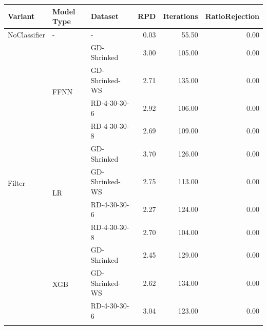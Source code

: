 \begin{table}[ht]
	\small
	\centering
	\renewcommand{\arraystretch}{1.1}
	\begin{tabular}{lllrrr}
		\toprule
		\textbf{Variant}          & \textbf{Model Type}   & \textbf{Dataset} & \textbf{}RPD & \textbf{Iterations} & \textbf{RatioRejection} \\
		\midrule
		NoClassifier              & -                     & -                & 0.03         & 55.50               & 0.00                    \\\hline
		\multirow{12}{*}{Filter}  & \multirow{4}{*}{FFNN} & GD-Shrinked      & 3.00         & 105.00              & 0.00                    \\\cline{3-6}
		                          &                       & GD-Shrinked-WS   & 2.71         & 135.00              & 0.00                    \\\cline{3-6}
		                          &                       & RD-4-30-30-6     & 2.92         & 106.00              & 0.00                    \\\cline{3-6}
		                          &                       & RD-4-30-30-8     & 2.69         & 109.00              & 0.00                    \\\cline{2-6}
		                          & \multirow{4}{*}{LR}   & GD-Shrinked      & 3.70         & 126.00              & 0.00                    \\\cline{3-6}
		                          &                       & GD-Shrinked-WS   & 2.75         & 113.00              & 0.00                    \\\cline{3-6}
		                          &                       & RD-4-30-30-6     & 2.27         & 124.00              & 0.00                    \\\cline{3-6}
		                          &                       & RD-4-30-30-8     & 2.70         & 104.00              & 0.00                    \\\cline{2-6}
		                          & \multirow{4}{*}{XGB}  & GD-Shrinked      & 2.45         & 129.00              & 0.00                    \\\cline{3-6}
		                          &                       & GD-Shrinked-WS   & 2.62         & 134.00              & 0.00                    \\\cline{3-6}
		                          &                       & RD-4-30-30-6     & 3.04         & 123.00              & 0.00                    \\\cline{3-6}

\end{tabular}
\end{table}
